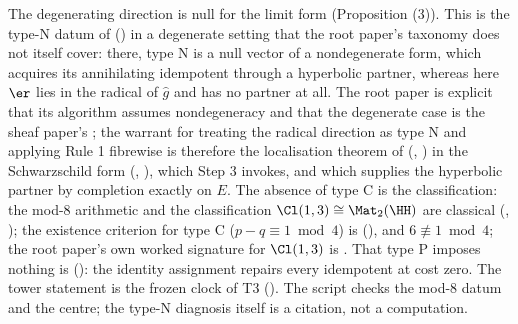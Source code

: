 The degenerating direction is null for the limit form (Proposition (3)). This is the type-N datum of \cite[Def.~3.1, Prop.~3.3]{ButlerT1} () in a degenerate setting that the root paper's taxonomy does not itself cover: there, type N is a null vector of a nondegenerate form, which acquires its annihilating idempotent through a hyperbolic partner, whereas here $\er$ lies in the radical of $\hat g$ and has no partner at all. The root paper is explicit that its algorithm assumes nondegeneracy and that the degenerate case is the sheaf paper's \cite[Rem.~4.15, Rem.~8.4]{ButlerT1}; the warrant for treating the radical direction as type N and applying Rule 1 fibrewise is therefore the localisation theorem of \cite[Thm.~4.4, Cor.~4.5]{ButlerT4} (, ) in the Schwarzschild form \cite[Thms 8.7, 8.12]{ButlerT4} (, ), which Step 3 invokes, and which supplies the hyperbolic partner by completion exactly on $E$. The absence of type C is the classification: the mod-8 arithmetic and the classification $\Cl(1,3) \cong \Mat_2(\HH)$ are classical \cite{Porteous1995} (, ); the existence criterion for type C ($p - q \equiv 1 \bmod 4$) is \cite[Thm.~3.6]{ButlerT1} (), and $6 \not\equiv 1 \bmod 4$; the root paper's own worked signature for $\Cl(1,3)$ is \cite[Ex.~3.12]{ButlerT1}. That type P imposes nothing is \cite[Prop.~6.1]{ButlerT1} (): the identity assignment repairs every idempotent at cost zero. The tower statement is the frozen clock of T3 \cite{ButlerT3} (). The script checks the mod-8 datum and the centre; the type-N diagnosis itself is a citation, not a computation.
